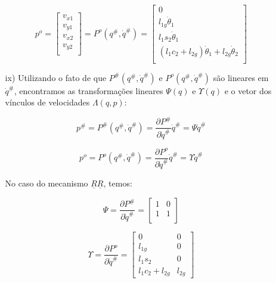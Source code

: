 \documentclass[12pt,a4paper]{article}
\begin{document}
\begin{itemize}
\begin{itemize}
	\begin{equation}
	p^o = 
	\begin{bmatrix}
	v_{x1} \\
	v_{y1} \\
	v_{x2} \\
	v_{y2} \\
	\end{bmatrix}
	= P^o (q^{\#}, \dot{q}^{\#} ) =
	\begin{bmatrix}
	0 \\
	l_{1g} \dot{\theta}_1 \\
	l_1 s_2 \dot{\theta}_1\\
	(l_1 c_2 + l_{2g} )\dot{\theta}_1 + l_{2g} \dot{\theta}_2 \\
	\end{bmatrix}
	\end{equation}
	
	\item[ix)] Utilizando o fato de que $P^{\#} (q^{\#}, \dot{q}^{\#} ) $ e $P^o (q^{\#}, \dot{q}^{\#} )$ são lineares em $\dot{q}^{\#}$, encontramos as transformações lineares $\Psi(q)$ e $\Upsilon(q)$ e o vetor dos vínculos de velocidades $\Lambda(q,p)$:
	
	\begin{equation}
	p^{\#} = P^{\#} (q^{\#}, \dot{q}^{\#} ) = \frac{\partial P^{\#}}{\partial \dot{q}^{\#}} \dot{q}^{\#} = \Psi \dot{q}^{\#}
	\end{equation}
	
	\begin{equation}
	p^o = P^o (q^{\#}, \dot{q}^{\#} ) = \frac{\partial P^o}{\partial \dot{q}^{\#}} \dot{q}^{\#} = \Upsilon \dot{q}^{\#}
	\end{equation}

	No caso do mecanismo $\underline{R}\underline{R}$, temos:
	
	\begin{equation}
	\Psi = \frac{\partial P^{\#}}{\partial \dot{q}^{\#}} =
	\begin{bmatrix}
	1 & 0  \\
	1 & 1  \\
	\end{bmatrix}
	\end{equation}
	
	\begin{equation}
	\Upsilon = \frac{\partial P^o}{\partial \dot{q}^{\#}} =
	\begin{bmatrix}
	0 & 0 \\
	l_{1g} & 0 \\
	l_1 s_2 & 0 \\
	l_1 c_2 + l_{2g} & l_{2g} 
	\end{bmatrix}
	\end{equation}\\


\end{itemize}
\end{itemize}
\end{document}
